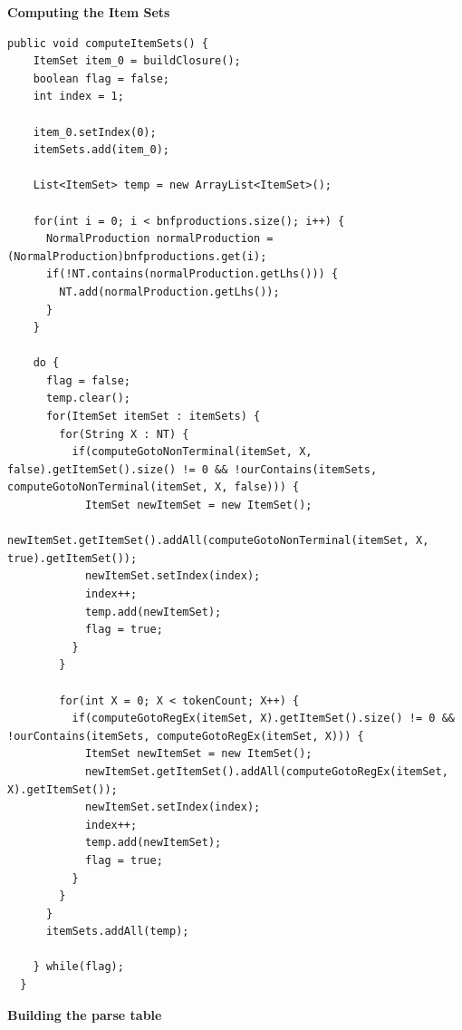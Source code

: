 \documentclass[oneside]{book}
\begin{document}
\textbf{Computing the Item Sets}
\begin{lstlisting}
public void computeItemSets() {
    ItemSet item_0 = buildClosure();
    boolean flag = false;
    int index = 1;
    
    item_0.setIndex(0);
    itemSets.add(item_0);
    
    List<ItemSet> temp = new ArrayList<ItemSet>();
    
    for(int i = 0; i < bnfproductions.size(); i++) {
      NormalProduction normalProduction = (NormalProduction)bnfproductions.get(i);
      if(!NT.contains(normalProduction.getLhs())) {
        NT.add(normalProduction.getLhs());
      }
    }
    
    do {
      flag = false;
      temp.clear();
      for(ItemSet itemSet : itemSets) {
        for(String X : NT) {
          if(computeGotoNonTerminal(itemSet, X, false).getItemSet().size() != 0 && !ourContains(itemSets, computeGotoNonTerminal(itemSet, X, false))) {
            ItemSet newItemSet = new ItemSet();
            newItemSet.getItemSet().addAll(computeGotoNonTerminal(itemSet, X, true).getItemSet());
            newItemSet.setIndex(index);
            index++;
            temp.add(newItemSet);
            flag = true;
          }
        }
        
        for(int X = 0; X < tokenCount; X++) {
          if(computeGotoRegEx(itemSet, X).getItemSet().size() != 0 && !ourContains(itemSets, computeGotoRegEx(itemSet, X))) {
            ItemSet newItemSet = new ItemSet();
            newItemSet.getItemSet().addAll(computeGotoRegEx(itemSet, X).getItemSet());
            newItemSet.setIndex(index);
            index++;
            temp.add(newItemSet);
            flag = true;
          }
        }
      }
      itemSets.addAll(temp);
      
    } while(flag);
  }
\end{lstlisting}
\textbf{Building the parse table}
\end{document}
